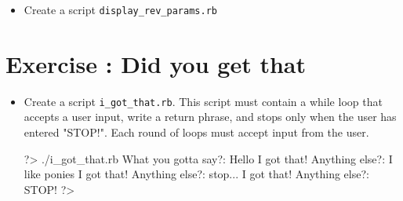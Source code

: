 \documentclass{42-en}
\begin{document}
\exnumber{\exercicenumber}


\begin{itemize}

\item Create a script \texttt{display\_rev\_params.rb} 


\end{itemize}



\chapter{Exercise \exercicenumber: Did you get that}

\exnumber{\exercicenumber}


\begin{itemize}

\item Create a script \texttt{i\_got\_that.rb}. This script must contain a while loop that accepts a user input, write a return phrase, and stops only when the user has entered "STOP!". Each round of loops must accept input from the user.

\begin{42console}
	?> ./i_got_that.rb
	What you gotta say?: Hello
	I got that! Anything else?: I like ponies
	I got that! Anything else?: stop...
	I got that! Anything else?: STOP!
	?>
\end{42console}

\end{itemize}
\end{document}
